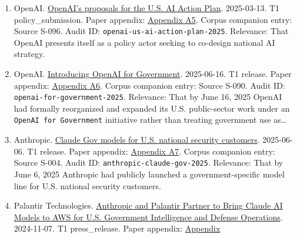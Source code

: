 \documentclass[
  american,
  11pt,
  letterpaper,
]{article}
\begin{document}
\begin{enumerate}
  appendix:
  \hyperref[ch-07-appendix-a4-request-for-information-on-the-development-of-an-artificial-intelligence-ai-action-plan]{Appendix
  A4}. Corpus companion entry: Source S-054. Audit ID:
  \texttt{fr-ai-action-plan-rfi-2025}. Relevance: That the state created
  an official consultation pathway for shaping the 2025 AI doctrine.
\item
  OpenAI.
  \href{https://openai.com/global-affairs/openai-proposals-for-the-us-ai-action-plan/}{OpenAI's
  proposals for the U.S. AI Action Plan}. 2025-03-13. T1
  policy\_submission. Paper appendix:
  \hyperref[ch-07-appendix-a5-openais-proposals-for-the-us-ai-action-plan]{Appendix
  A5}. Corpus companion entry: Source S-096. Audit ID:
  \texttt{openai-us-ai-action-plan-2025}. Relevance: That OpenAI
  presents itself as a policy actor seeking to co-design national AI
  strategy.
\item
  OpenAI.
  \href{https://openai.com/global-affairs/introducing-openai-for-government/}{Introducing
  OpenAI for Government}. 2025-06-16. T1 release. Paper appendix:
  \hyperref[ch-07-appendix-a6-introducing-openai-for-government]{Appendix
  A6}. Corpus companion entry: Source S-090. Audit ID:
  \texttt{openai-for-government-2025}. Relevance: That by June 16, 2025
  OpenAI had formally reorganized and expanded its U.S. public-sector
  work under an \texttt{OpenAI\ for\ Government} initiative rather than
  treating government use as\ldots{}
\item
  Anthropic.
  \href{https://www.anthropic.com/news/claude-gov-models-for-u-s-national-security-customers}{Claude
  Gov models for U.S. national security customers}. 2025-06-06. T1
  release. Paper appendix:
  \hyperref[ch-07-appendix-a7-claude-gov-models-for-u-s-national-security-customers]{Appendix
  A7}. Corpus companion entry: Source S-004. Audit ID:
  \texttt{anthropic-claude-gov-2025}. Relevance: That by June 6, 2025
  Anthropic had publicly launched a government-specific model line for
  U.S. national security customers.
\item
  Palantir Technologies.
  \href{https://investors.palantir.com/news-details/2024/Anthropic-and-Palantir-Partner-to-Bring-Claude-AI-Models-to-AWS-for-U.S.-Government-Intelligence-and-Defense-Operations/}{Anthropic
  and Palantir Partner to Bring Claude AI Models to AWS for U.S.
  Government Intelligence and Defense Operations}. 2024-11-07. T1
  press\_release. Paper appendix:
  \hyperref[ch-07-appendix-a8-anthropic-and-palantir-partner-to-bring-claude-ai-models-to-aws-for-u-s-government-intelligence-and-defense-operations]{Appendix
}
\end{enumerate}
\end{document}
